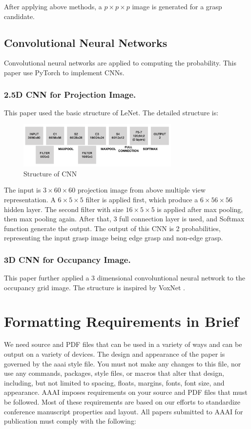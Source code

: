 \documentclass[letterpaper]{article} %
\begin{document}
After applying above methods, a $p\times p\times p$ image is generated for a grasp candidate.

\subsection{Convolutional Neural Networks}
Convolutional neural networks are applied to computing the probability. This paper use PyTorch \cite{Pytorch} to implement CNNs.

\subsubsection{2.5D CNN for Projection Image.} This paper used the basic structure of LeNet\cite{RN3}. The detailed structure is:
\begin{figure}[H]
    \centering
    \includegraphics[width=8cm]{images/CNN.png}
    \caption{Structure of CNN}
    \label{fig:my_label}
\end{figure}
The input is $3\times60\times60$ projection image from above multiple view representation. A $6\times5\times5$ filter is applied first, which produce a $6\times56\times56$ hidden layer. The second filter with size $16\times5\times5$ is applied after max pooling, then max pooling again. After that, 3 full connection layer is used, and Softmax function generate the output. The output of this CNN is 2 probabilities, representing the input grasp image being edge grasp and non-edge grasp.

\subsubsection{3D CNN for Occupancy Image.} This paper further applied a 3 dimensional convoluntional neural network to the occupancy grid image. The structure is inspired by VoxNet \cite{RN4}. 



\clearpage
\section{Formatting Requirements in Brief}
We need source and PDF files that can be used in a variety of ways and can be output on a variety of devices. The design and appearance of the paper is governed by the aaai style file. You must not make any changes to this file, nor use any commands, packages, style files, or macros that alter that design, including, but not limited to spacing, floats, margins, fonts, font size, and appearance. AAAI imposes  requirements on your source and PDF files that must be followed. Most of these requirements are based on our efforts to standardize conference manuscript properties and layout. All papers submitted to AAAI for publication must comply with the following:
\end{document}
